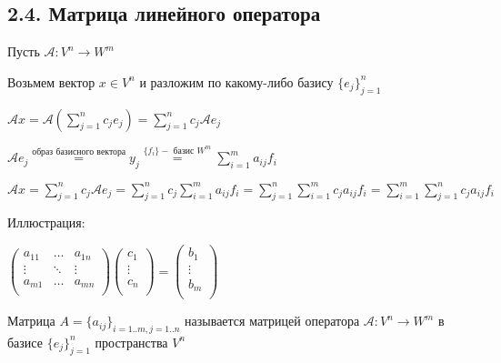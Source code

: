 \documentclass[12pt]{article}
\begin{document}
    \subsection{2.4. Матрица линейного оператора}

    Пусть $\mathcal{A} : V^n \rightarrow W^m$

    Возьмем вектор $x \in V^n$ и разложим по какому-либо базису $\{e_j\}^n_{j=1}$

    $\mathcal{A}x = \mathcal{A} \left(\sum^n_{j=1} c_j e_j\right) = \sum^n_{j=1} c_j \mathcal{A}e_j$

    $\mathcal{A} e_j \stackrel{\text{образ базисного вектора}}{=} y_j \stackrel{\{f_i\} - \text{ базис } W^m}{=} \sum^m_{i=1} a_{ij}f_i$

    $\mathcal{A}x = \sum^n_{j=1} c_j \mathcal{A}e_j = \sum^n_{j=1} c_j \sum^m_{i=1} a_{ij}f_i = \sum^n_{j=1} \sum^m_{i=1} c_j a_{ij} f_i = \sum^m_{i=1} \sum^n_{j=1} c_j a_{ij} f_i$

    Иллюстрация:

    $\begin{pmatrix}
         a_{11} & \dots & a_{1n} \\
         \vdots & \ddots & \vdots \\
         a_{m1} & \dots & a_{mn} \\
    \end{pmatrix} \begin{pmatrix}
         c_{1} \\
         \vdots \\
         c_{n} \\
    \end{pmatrix} = \begin{pmatrix}
         b_{1} \\
         \vdots \\
         b_{m} \\
    \end{pmatrix}$

    \hypertarget{operatorsmatrix}{}

    \Def Матрица $A = \{a_{ij}\}_{i=1..m, j=1..n}$ называется матрицей оператора $\mathcal{A} : V^n \rightarrow W^m$ в базисе $\{e_j\}^n_{j=1}$ пространства $V^n$
\end{document}
